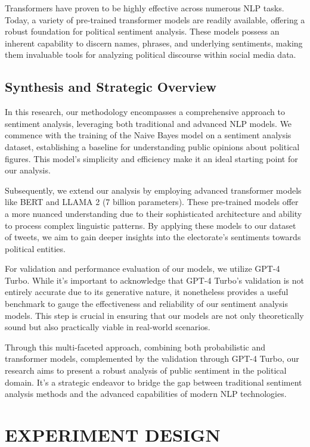 \documentclass[10pt]{article}
\begin{document}
\begin{multicols}{2}
Transformers have proven to be highly effective across numerous NLP tasks. Today, a variety of pre-trained transformer models are readily available, offering a robust foundation for political sentiment analysis. These models possess an inherent capability to discern names, phrases, and underlying sentiments, making them invaluable tools for analyzing political discourse within social media data.


\subsection{Synthesis and Strategic Overview}
In this research, our methodology encompasses a comprehensive approach to sentiment analysis, leveraging both traditional and advanced NLP models. We commence with the training of the Naive Bayes model on a sentiment analysis dataset, establishing a baseline for understanding public opinions about political figures. This model's simplicity and efficiency make it an ideal starting point for our analysis.

Subsequently, we extend our analysis by employing advanced transformer models like BERT and LLAMA 2 (7 billion parameters). These pre-trained models offer a more nuanced understanding due to their sophisticated architecture and ability to process complex linguistic patterns. By applying these models to our dataset of tweets, we aim to gain deeper insights into the electorate's sentiments towards political entities.

For validation and performance evaluation of our models, we utilize GPT-4 Turbo. While it's important to acknowledge that GPT-4 Turbo's validation is not entirely accurate due to its generative nature, it nonetheless provides a useful benchmark to gauge the effectiveness and reliability of our sentiment analysis models. This step is crucial in ensuring that our models are not only theoretically sound but also practically viable in real-world scenarios.

Through this multi-faceted approach, combining both probabilistic and transformer models, complemented by the validation through GPT-4 Turbo, our research aims to present a robust analysis of public sentiment in the political domain. It's a strategic endeavor to bridge the gap between traditional sentiment analysis methods and the advanced capabilities of modern NLP technologies.


\section{EXPERIMENT DESIGN}


\end{multicols}
\end{document}
